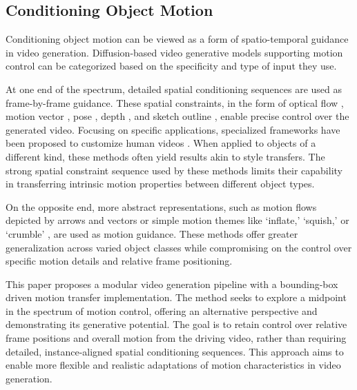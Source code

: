 \subsection{Conditioning Object Motion}

Conditioning object motion can be viewed as a form of spatio-temporal guidance in video generation. Diffusion-based video generative models supporting motion control can be categorized based on the specificity and type of input they use.

At one end of the spectrum, detailed spatial conditioning sequences are used as frame-by-frame guidance. These spatial constraints, in the form of optical flow \cite{ni2023conditional}, motion vector \cite{2023videocomposer}, pose \cite{feng2023dreamoving}, depth \cite{2023videocomposer, feng2023dreamoving}, and sketch outline \cite{2023videocomposer}, enable precise control over the generated video. Focusing on specific applications, specialized frameworks have been proposed to customize human videos \cite{feng2023dreamoving}. When applied to objects of a different kind, these methods often yield results akin to style transfers. The strong spatial constraint sequence used by these methods limits their capability in transferring intrinsic motion properties between different object types.

On the opposite end, more abstract representations, such as motion flows depicted by arrows \cite{yin2023dragnuwa, 2023videocomposer} and vectors \cite{2023videocomposer} or simple motion themes like ‘inflate,’ ‘squish,’ or ‘crumble’ \cite{Pikaffect}, are used as motion guidance. These methods offer greater generalization across varied object classes while compromising on the control over specific motion details and relative frame positioning.

This paper proposes a modular video generation pipeline with a bounding-box driven motion transfer implementation. The method seeks to explore a midpoint in the spectrum of motion control, offering an alternative perspective and demonstrating its generative potential. The goal is to retain control over relative frame positions and overall motion from the driving video, rather than requiring detailed, instance-aligned spatial conditioning sequences. This approach aims to enable more flexible and realistic adaptations of motion characteristics in video generation.
